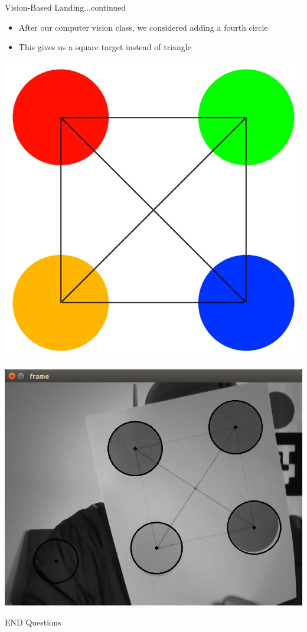 \documentclass[11pt]{beamer}
\begin{document}
\begin{frame}{Vision-Based Landing...continued}
	\begin{itemize}
		\item After our computer vision class, we considered adding a fourth circle
		\item This gives us a square target instead of triangle
	\end{itemize}
\centering	\includegraphics[width=.5\textwidth]{images/landing_guide_small_x}
\end{frame}

\begin{frame}
	\includegraphics[width=1\textwidth]{images/circles}
\end{frame}

\begin{frame}{ END}
\centering	Questions
\end{frame}
\end{document}
